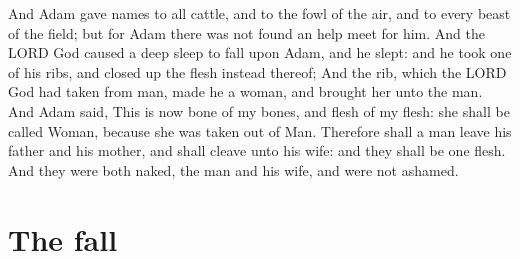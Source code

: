 \begin{biblechapter}
\verse And Adam gave names to all cattle, and to the fowl of the air, and to every beast of the field; but for Adam there was not found an help meet for him.
\verse And the LORD God caused a deep sleep to fall upon Adam, and he slept: and he took one of his ribs, and closed up the flesh instead thereof;
\verse And the rib, which the LORD God had taken from man, made he a woman, and brought her unto the man.
\verse And Adam said, This is now bone of my bones, and flesh of my flesh: she shall be called Woman, because she was taken out of Man.
\verse Therefore shall a man leave his father and his mother, and shall cleave unto his wife: and they shall be one flesh.
\verse And they were both naked, the man and his wife, and were not ashamed.
\end{biblechapter}

\section*{The fall}
